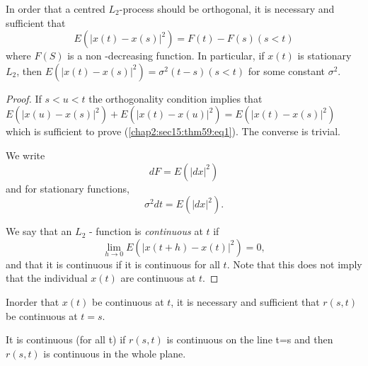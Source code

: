 \begin{theorem}\label{chap2:sec15:thm59} %
  In order that a centred $L_2$-process should be 
  orthogonal, it is necessary and sufficient that 
  \begin{equation*}
    E(|x(t)-x(s)|^2)= F(t)-F(s)(s<t)\tag{1}\label{chap2:sec15:thm59:eq1}
  \end{equation*}
  where $F(S)$ is a non -decreasing function. In particular, if $x(t)$ is
  stationary $L_2$, then $E(|x(t)-x(s)|^2)= \sigma^2(t-s)(s<t)$
  for some constant $\sigma^2$.
\end{theorem}

\begin{proof}
  If $s<u<t$ the orthogonality condition implies that  $
  E(|x(u)-x(s)|^2)+E(|x(t)-x(u)|^2)= E(|x(t)-x(s)|^2)$ 
  which is sufficient to prove (\ref{chap2:sec15:thm59:eq1}). The
  converse is trivial. 

  We write
  $$
  dF=E(|dx|^2)
  $$
  and for stationary functions,
  $$
  \sigma^2 dt=E(|dx|^2).
  $$
  
  We say that an $L_2$ - function is \textit{continuous} at $t$ if 
  $$
  \lim\limits_{h\longrightarrow 0} E (|x(t+h)-x(t)|^2)=0,
  $$ 
  and that it is continuous if it is continuous for all $t$.
  Note that this does not imply that the individual $x(t)$ are
  continuous at $t$.
\end{proof}

\begin{theorem}[Slutsky]\label{chap2:sec15:thm60}%
  In\pageoriginale order that $x(t)$ be continuous
  at $t$, it is necessary and sufficient that $r(s,t)$ be continuous at
  $t=s$.
  
  It is continuous (for all t) if $r(s,t)$ is continuous on 
  the line t=s and then $r(s,t)$  is continuous in the whole plane.
\end{theorem}

